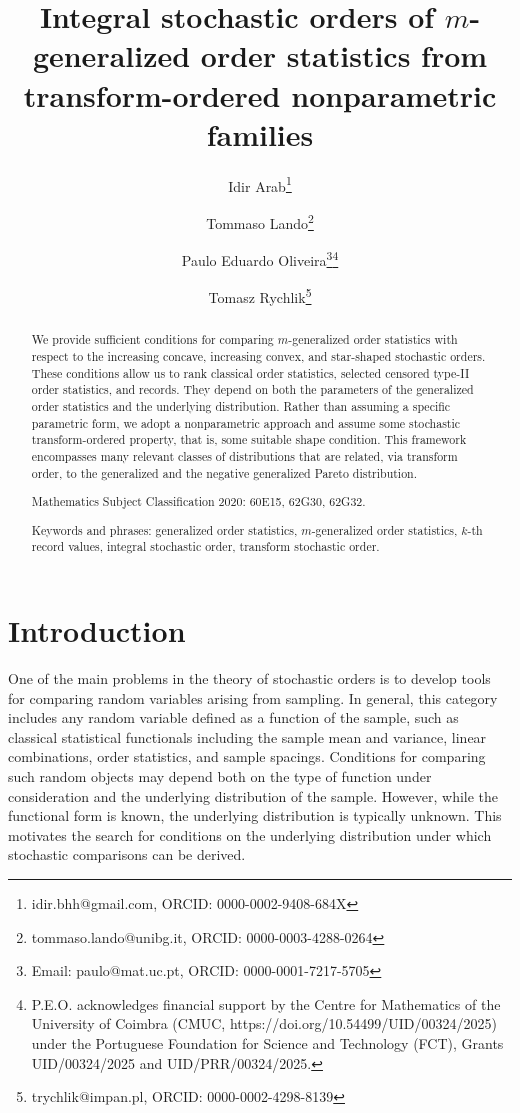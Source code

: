 \documentclass [11pt]{article}
\title{Integral stochastic orders of $m$-generalized order statistics from transform-ordered nonparametric families}
\author[1]{Idir Arab\thanks{idir.bhh@gmail.com, ORCID: 0000-0002-9408-684X}}
\author[2]{Tommaso Lando\thanks{tommaso.lando@unibg.it, ORCID: 0000-0003-4288-0264}}
\author[1]{Paulo Eduardo Oliveira\thanks{Email: paulo@mat.uc.pt, ORCID: 0000-0001-7217-5705}\thanks{P.E.O. acknowledges financial support by the Centre for Mathematics of the University of Coimbra (CMUC, https://doi.org/10.54499/UID/00324/2025)
under the Portuguese Foundation for Science and Technology (FCT),
Grants UID/00324/2025 and UID/PRR/00324/2025.}%
}
\author[3]{Tomasz Rychlik\thanks{trychlik@impan.pl, ORCID: 0000-0002-4298-8139}}
\affil[1]{CMUC, Department of Mathematics, University of Coimbra, Portugal}
\affil[2]{Department of Economics, University of Bergamo, Italy}
\affil[3]{Institute of Mathematics, Polish Academy of Sciences, Poland }
\date{}
\begin{document}
\maketitle

\begin{abstract}
We provide sufficient conditions for comparing $m$-generalized order statistics with respect to the increasing concave, increasing convex, and star-shaped stochastic orders. These conditions allow us to rank classical order statistics, 
selected censored type-II order statistics, and records. They depend on both the parameters of the generalized order statistics and the underlying distribution. Rather than assuming a specific parametric form, we adopt a nonparametric approach and 
assume some stochastic transform-ordered property, that is, some suitable shape condition. 
This framework encompasses many relevant classes of distributions that are related, via transform order, to the generalized and the negative generalized Pareto distribution.

\medskip

\noindent Mathematics Subject Classification 2020: 60E15, 62G30, 62G32.

\medskip

\noindent
Keywords and phrases: generalized order statistics, $m$-generalized order statistics, $k$-th record values, integral stochastic order, transform stochastic order.

\end{abstract}

\section{Introduction}

One of the main problems in the theory of stochastic orders is to develop tools for comparing random variables arising from sampling. In general, this category includes any random variable defined as a function of the sample, such as classical statistical functionals including the sample mean and variance, linear combinations, order statistics, and sample spacings. Conditions for comparing such random objects may depend both on the type of function under consideration and the underlying distribution of the sample. However, while the functional form is known, the underlying distribution is typically unknown. 
This motivates the search for conditions on the underlying distribution under which stochastic comparisons can be derived.
\end{document}
